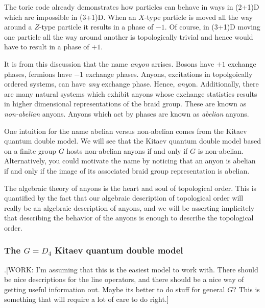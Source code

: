 \documentclass{article}
\theoremstyle{definition}
\newcommand{\0}{\left|0\right>}
\newcommand{\1}{\left|1\right>}
\numberwithin{figure}{section}
\begin{document}
The toric code already demonstrates how particles can behave in ways in (2+1)D which are impossible in (3+1)D. When an $X$-type particle is moved all the way around a $Z$-type particle it results in a phase of $-1$. Of course, in (3+1)D moving one particle all the way around another is topologically trivial and hence would have to result in a phase of $+1$.

It is from this discussion that the name \textit{anyon} arrises. Bosons have $+1$ exchange phases, fermions have $-1$ exchange phases. Anyons, excitations in topolgoically ordered systems, can have \textit{any} exchange phase. Hence, \textit{any}on. Additionally, there are many natural systems which exhibit anyons whose exchange statistics results in higher dimensional representations of the braid group. These are known as \textit{non-abelian} anyons. Anyons which act by phases are known as \textit{abelian} anyons.

One intuition for the name abelian versus non-abelian comes from the Kitaev quantum double model. We will see that the Kitaev quantum double model based on a finite group $G$ hosts non-abelian anyons if and only if $G$ is non-abelian. Alternatively, you could motivate the name by noticing that an anyon is abelian if and only if the image of its associated braid group representation is abelian.

The algebraic theory of anyons is the heart and soul of topological order. This is quantified by the fact that our algebraic description of topological order will really be an algebraic description of anyons, and we will be asserting implicitely that describing the behavior of the anyons is enough to describe the topological order.

\subsubsection{The $G=D_4$ Kitaev quantum double model}

.[WORK: I'm assuming that this is the easiest model to work with. There should be nice descriptions for the line operators, and there should be a nice way of getting useful information out. Maybe its better to do stuff for general $G$? This is something that will require a lot of care to do right.]
\end{document}
